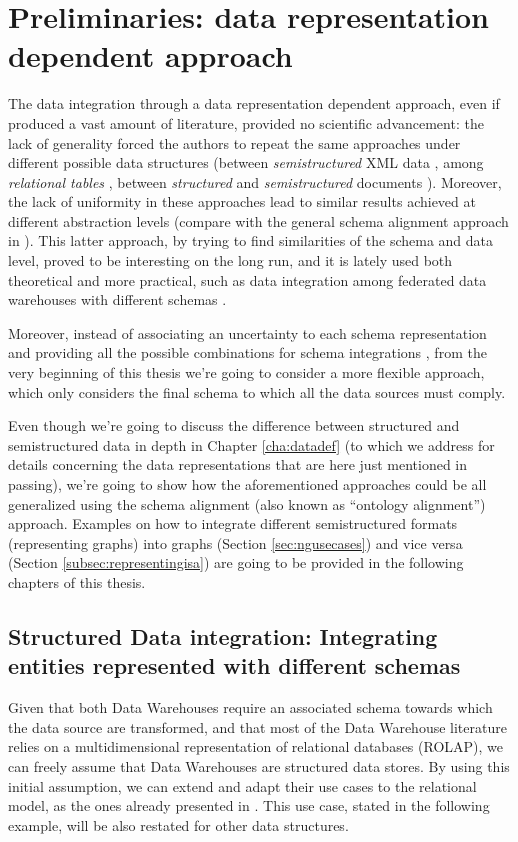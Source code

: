 

\section{Preliminaries: data representation dependent approach}\label{sec:oldschooldi}
The data integration through a data representation dependent approach, even if produced a vast amount of literature, provided no scientific advancement: the lack of generality forced the authors to repeat the same approaches under different possible data structures (between \textit{semistructured} XML data \cite{APoggi06}, among \textit{relational tables} \cite{Magnani09}, between \textit{structured} and \textit{semistructured} documents \cite{ManolescuFK01,Lu2006,Magnani06}). Moreover, the lack of uniformity in these approaches lead to similar results achieved at different abstraction levels (compare \cite{GolfarelliMPRT12} with the general schema alignment approach in \cite{euzenat2013d}). This latter approach, by trying to find similarities of the schema and data level, proved to be interesting on the long run, and it is lately used  both theoretical \cite{VirgilioMT15} and more practical, such as data integration among federated data warehouses with different schemas \cite{GolfarelliMPRT12}.

Moreover, instead of associating an uncertainty to each schema representation and providing all the possible combinations for schema integrations \cite{Magnani09}, from the very beginning of this thesis we're going to consider a more flexible approach, which only considers the final schema to which all the data sources must  comply.

Even though we're going to discuss the difference between structured and semistructured data in depth in Chapter \ref{cha:datadef} (to which we address for details concerning the data representations that are here just mentioned in passing), we're going to show how the aforementioned approaches could be all generalized using the schema alignment (also known as ``ontology alignment'')  approach. Examples on how to integrate different semistructured formats (representing graphs) into graphs (Section \vref{sec:ngusecases}) and vice versa (Section \vref{subsec:representingisa}) are going to be provided in the following chapters of this thesis.


\subsection{Structured Data integration: Integrating entities represented with different schemas}\label{subsec:treunouno}
Given that both Data Warehouses require an associated schema towards which the data source are transformed, and that most of the Data Warehouse literature relies on a multidimensional representation of relational databases (ROLAP), we can freely assume that Data Warehouses are structured data stores. By using this initial assumption, we can extend and adapt their use cases to the relational model, as the ones already presented in \cite{GolfarelliMPRT12}. This use case, stated in the following example, will be also restated for other data structures.

